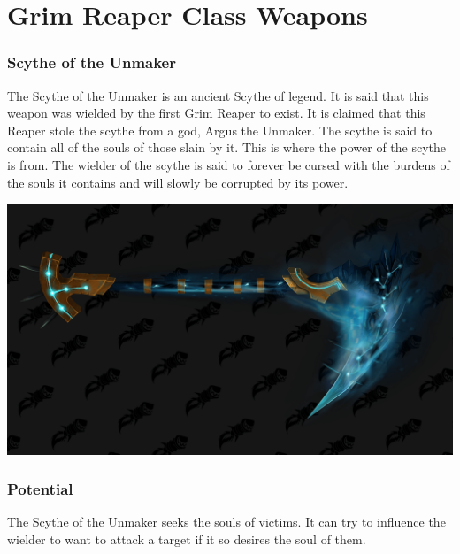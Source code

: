 \section{Grim Reaper Class Weapons}

\subsubsection{Scythe of the Unmaker}

The Scythe of the Unmaker is an ancient Scythe of legend. It is said that this weapon was wielded by the first Grim Reaper to exist. It is claimed that this Reaper stole the scythe from a god, Argus the Unmaker. The scythe is said to contain all of the souls of those slain by it. This is  where the power of the scythe is from. The wielder of the scythe is said to forever be cursed with the burdens of the souls it contains and will slowly be corrupted by its power.

\begin{center}
	\includegraphics[width=\linewidth]{img/weapons/1213012.png}
\end{center}

\subsubsection{Potential}

The Scythe of the Unmaker seeks the souls of victims. It can try to influence the wielder to want to attack a target if it so desires the soul of them.


